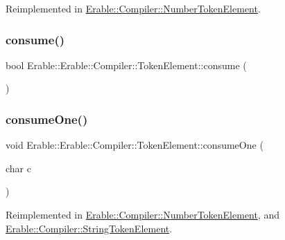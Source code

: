 Reimplemented in \mbox{\hyperlink{class_erable_1_1_compiler_1_1_number_token_element_addd51ef96a5f6a1129038c03f93b1792}{Erable\+::\+Compiler\+::\+Number\+Token\+Element}}.

\mbox{\label{class_erable_1_1_compiler_1_1_token_element_af86a746034d9c4bcdcaf7c3b6cd66ad3}} 
\subsubsection{\texorpdfstring{consume()}{consume()}}
{\footnotesize\ttfamily bool Erable\+::\+Erable\+::\+Compiler\+::\+Token\+Element\+::consume (\begin{DoxyParamCaption}{ }\end{DoxyParamCaption})\hspace{0.3cm}{\ttfamily [virtual]}}

\mbox{\label{class_erable_1_1_compiler_1_1_token_element_a36d20884e5ba6cfa46fcd28711be9589}} 
\subsubsection{\texorpdfstring{consumeOne()}{consumeOne()}}
{\footnotesize\ttfamily void Erable\+::\+Erable\+::\+Compiler\+::\+Token\+Element\+::consume\+One (\begin{DoxyParamCaption}\item[{char}]{c }\end{DoxyParamCaption})\hspace{0.3cm}{\ttfamily [virtual]}}



Reimplemented in \mbox{\hyperlink{class_erable_1_1_compiler_1_1_number_token_element_aa664539cd00997b60350d3ffd9cb1a7a}{Erable\+::\+Compiler\+::\+Number\+Token\+Element}}, and \mbox{\hyperlink{class_erable_1_1_compiler_1_1_string_token_element_a8db2f3d10cc46b873ccfb7db8c90c709}{Erable\+::\+Compiler\+::\+String\+Token\+Element}}.

\mbox{\label{class_erable_1_1_compiler_1_1_token_element_a481e4deb721a1a5f435ee27f850cdf81}} 
